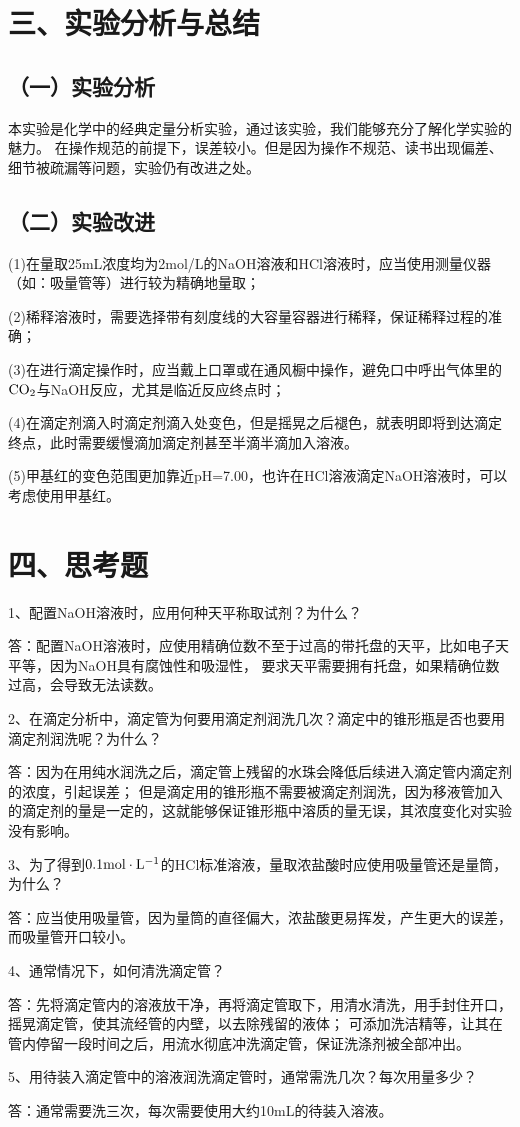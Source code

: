 \documentclass[a4paper,12pt]{article}
\begin{document}
\section*{三、实验分析与总结}
\subsection*{（一）实验分析}
本实验是化学中的经典定量分析实验，通过该实验，我们能够充分了解化学实验的魅力。
在操作规范的前提下，误差较小。但是因为操作不规范、读书出现偏差、细节被疏漏等问题，实验仍有改进之处。
\subsection*{（二）实验改进}
(1)在量取25mL浓度均为2mol/L的NaOH溶液和HCl溶液时，应当使用测量仪器（如：吸量管等）进行较为精确地量取；

(2)稀释溶液时，需要选择带有刻度线的大容量容器进行稀释，保证稀释过程的准确；

(3)在进行滴定操作时，应当戴上口罩或在通风橱中操作，避免口中呼出气体里的${\rm CO_2}$与NaOH反应，尤其是临近反应终点时；

(4)在滴定剂滴入时滴定剂滴入处变色，但是摇晃之后褪色，就表明即将到达滴定终点，此时需要缓慢滴加滴定剂甚至半滴半滴加入溶液。

(5)甲基红的变色范围更加靠近pH=7.00，也许在HCl溶液滴定NaOH溶液时，可以考虑使用甲基红。

\section*{四、思考题}
1、配置NaOH溶液时，应用何种天平称取试剂？为什么？

答：配置NaOH溶液时，应使用精确位数不至于过高的带托盘的天平，比如电子天平等，因为NaOH具有腐蚀性和吸湿性，
要求天平需要拥有托盘，如果精确位数过高，会导致无法读数。

2、在滴定分析中，滴定管为何要用滴定剂润洗几次？滴定中的锥形瓶是否也要用滴定剂润洗呢？为什么？

答：因为在用纯水润洗之后，滴定管上残留的水珠会降低后续进入滴定管内滴定剂的浓度，引起误差；
但是滴定用的锥形瓶不需要被滴定剂润洗，因为移液管加入的滴定剂的量是一定的，这就能够保证锥形瓶中溶质的量无误，其浓度变化对实验没有影响。

3、为了得到${\rm 0.1mol\cdot L^{-1}}$的HCl标准溶液，量取浓盐酸时应使用吸量管还是量筒，为什么？

答：应当使用吸量管，因为量筒的直径偏大，浓盐酸更易挥发，产生更大的误差，而吸量管开口较小。

4、通常情况下，如何清洗滴定管？

答：先将滴定管内的溶液放干净，再将滴定管取下，用清水清洗，用手封住开口，摇晃滴定管，使其流经管的内壁，以去除残留的液体；
可添加洗洁精等，让其在管内停留一段时间之后，用流水彻底冲洗滴定管，保证洗涤剂被全部冲出。

5、用待装入滴定管中的溶液润洗滴定管时，通常需洗几次？每次用量多少？

答：通常需要洗三次，每次需要使用大约10mL的待装入溶液。
\end{document}
